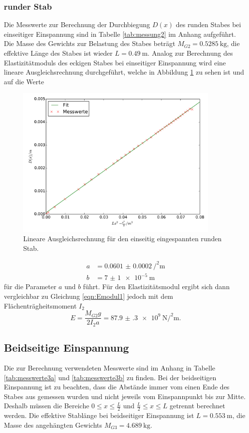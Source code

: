 \subsubsection{runder Stab}
Die Messwerte zur Berechnung der Durchbiegung $D(x)$ des runden Stabes bei
einseitiger Einspannung sind in Tabelle \ref{tab:messung2} im Anhang aufgeführt.
Die Masse des Gewichts zur Belastung des Stabes beträgt $M_{G2} = \SI{0.5285}
{\kilo\gram}$, die effektive Länge des Stabes ist wieder $L=\SI{0.49}
{\meter}$. Analog zur Berechnung des Elastizitätmoduls des eckigen Stabes bei
einseitiger Einspannung wird eine lineare Ausgleichsrechnung durchgeführt, welche
in Abbildung \ref{fig:plot_einseitig2} zu sehen ist und auf die Werte
\begin{figure}
  \centering
  \includegraphics[width=0.9\textwidth]{stab2_einseitig.pdf}
  \caption{Lineare Ausgleichsrechnung für den einseitig eingespannten runden Stab.}
  \label{fig:plot_einseitig2}
\end{figure}
\begin{align*}
  a &= \SI{0.0601(2)}{\per\squared\meter} \\
  b &= \SI{7(1)e-5}{\meter}
\end{align*}
für die Parameter $a$ und $b$ führt. Für den Elastizitätsmodul ergibt sich dann
vergleichbar zu Gleichung \eqref{eqn:Emodul1} jedoch mit dem Flächenträgheitsmoment
$I_2$
\begin{equation}
  E = \frac{M_{G2} g}{2 I_2 a} = \SI{87.9(3)e+9}{\newton\per\squared\meter}.
\end{equation}

\subsection{Beidseitige Einspannung}
Die zur Berechnung verwendeten Messwerte sind im Anhang in Tabelle \ref{tab:messwerte3a}
und \ref{tab:messwerte3b} zu finden. Bei der beidseitigen Einspannung ist zu
beachten, dass die Abstände immer vom einen Ende des Stabes aus gemessen wurden
und nicht jeweils vom Einspannpunkt bis zur Mitte. Deshalb müssen die Bereiche
$0\leq x \leq \frac{L}{2}$ und $\frac{L}{2}\leq x \leq L$ getrennt berechnet
werden. Die effektive Stablänge bei beidseitiger Einspannung ist $L= \SI{0.553}
{\meter}$, die Masse des angehängten Gewichts $M_{G3} = \SI{4.689} {\kilo\gram}$.

